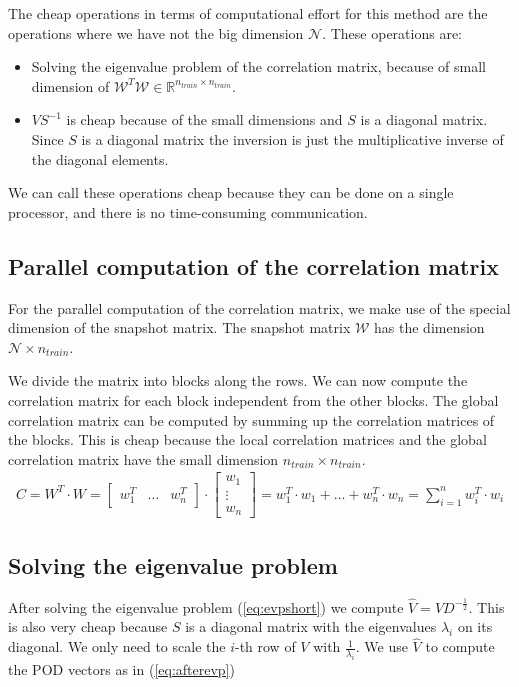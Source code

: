 The cheap operations in terms of computational effort for this method are the operations where we have not the big dimension $\mathcal{ N }$. These operations are:
\begin{itemize}
	\item Solving the eigenvalue problem of the correlation matrix, because of small dimension of $\mathcal{W}^T \mathcal{W} \in \mathbb{R}^{n_{train} \times n_{train}}$.
	\item $VS^{-1}$ is cheap because of the small dimensions and $S$ is a diagonal matrix.
	Since $S$ is a diagonal matrix the inversion is just the multiplicative inverse of the diagonal elements.
\end{itemize}
We can call these operations cheap because they can be done on a single processor, and there is no time-consuming communication.

\subsection{Parallel computation of the correlation matrix}
For the parallel computation of the correlation matrix, we make use of the special dimension of the snapshot matrix.
The snapshot matrix $\mathcal{W}$ has the dimension $\mathcal{ N } \times n_{train}$.

We divide the matrix into blocks along the rows. We can now compute the correlation matrix for each block independent from the other blocks. 
The global correlation matrix can be computed by summing up the correlation matrices of the blocks. 
This is cheap because the local correlation matrices and the global correlation matrix have the small dimension  $n_{train} \times n_{train}$.
\begin{align}
C = W^T \cdot W =
\begin{bmatrix} 
w_1^T & \hdots & w_n^T  
\end{bmatrix} 
\cdot 
\begin{bmatrix} 
w_1 \\ \vdots \\ w_n  
\end{bmatrix} = 
w_1^T \cdot w_1 + \hdots + w_n^T \cdot w_n = 
\sum_{i=1}^{n} w_i^T\cdot w_i
\end{align}

\subsection{Solving the eigenvalue problem}

After solving the eigenvalue problem (\ref{eq:evpshort}) we compute $ \hat{ V } = VD^{-\frac{1}{2}} $.
This is also very cheap because $S$ is a diagonal matrix with the eigenvalues $\lambda_{i}$ on its diagonal. 
We only need to scale the $i$-th row of $V$ with $\frac{1}{\lambda_{i}}$.
We use $\hat{ V }$ to compute the POD vectors as in (\ref{eq:afterevp})

